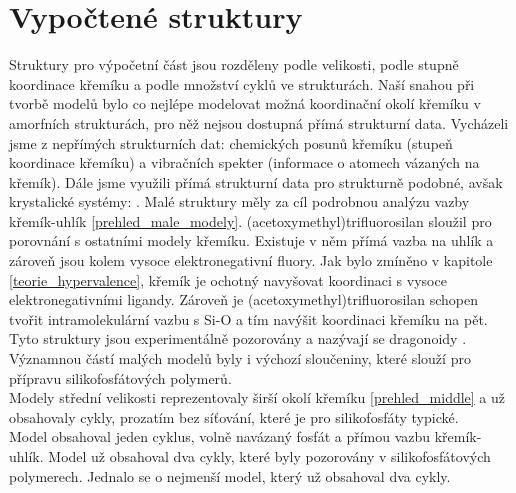 \documentclass[
digital, %
table,   %
lof,     %
lot,     %
oneside,
]{fithesis3}
\begin{document}
\section{Vypočtené struktury}\label{vypoctene_struktury}
Struktury pro výpočetní část jsou rozděleny podle velikosti, podle stupně koordinace křemíku a podle množství cyklů ve strukturách. Naší snahou při tvorbě modelů bylo co nejlépe modelovat možná koordinační okolí křemíku v amorfních strukturách, pro něž nejsou dostupná přímá strukturní data. Vycházeli jsme z nepřímých strukturních dat: chemických posunů křemíku (stupeň koordinace křemíku) a vibračních spekter (informace o atomech vázaných na křemík). Dále jsme využili přímá strukturní data pro strukturně podobné, avšak krystalické systémy: \cite{C3NJ00721A} \cite{rtg_4_pinkas}. Malé struktury měly za cíl podrobnou analýzu vazby křemík-uhlík \ref{prehled_male_modely}. (acetoxymethyl)trifluorosilan sloužil pro porovnání s ostatními modely křemíku. Existuje v něm přímá vazba na uhlík a zároveň jsou kolem vysoce elektronegativní fluory. Jak bylo zmíněno v kapitole \ref{teorie_hypervalence}, křemík je ochotný navyšovat koordinaci s vysoce elektronegativními ligandy. Zároveň je (acetoxymethyl)trifluorosilan schopen tvořit intramolekulární vazbu s Si-O a tím navýšit koordinaci křemíku na pět. Tyto  struktury jsou experimentálně pozorovány a nazývají se dragonoidy \cite{Chipanina2011}. Významnou částí malých modelů byly i výchozí sloučeniny, které slouží pro přípravu silikofosfátových polymerů.\\
Modely střední velikosti reprezentovaly širší okolí křemíku \ref{prehled_middle} a už obsahovaly cykly, prozatím bez síťování, které je pro silikofosfáty typické. \\
Model  obsahoval jeden cyklus, volně navázaný fosfát a přímou vazbu křemík-uhlík. Model  už obsahoval dva cykly, které byly pozorovány v silikofosfátových polymerech. Jednalo se o nejmenší model, který už obsahoval dva cykly.\\
\end{document}
